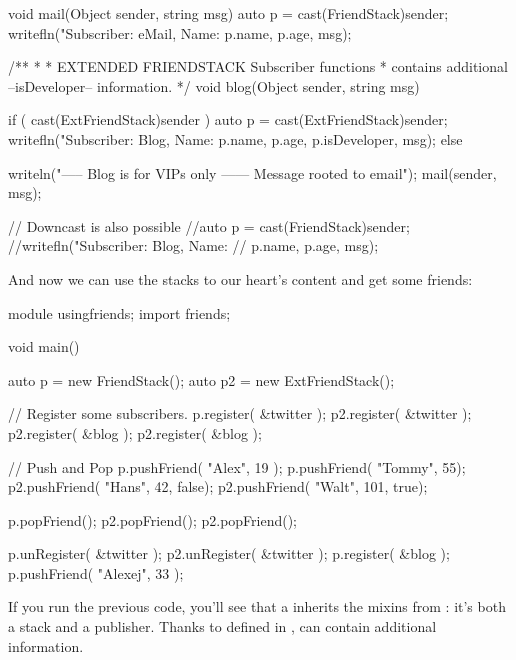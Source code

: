 \begin{dcode}
void mail(Object sender, string msg)
{
    auto p = cast(FriendStack)sender;
    writefln("Subscriber: eMail, Name: %
             p.name, p.age, msg);
}

/**
 *  
 *  EXTENDED FRIENDSTACK Subscriber functions
 *  contains additional --isDeveloper-- information.
 */
void blog(Object sender, string msg)
{
    if ( cast(ExtFriendStack)sender )
    {
        auto p = cast(ExtFriendStack)sender;
        writefln("Subscriber: Blog, Name: %
                 p.name, p.age, p.isDeveloper, msg);
    }
    else
    {
        writeln("----- Blog is for VIPs only ------ Message rooted to email");
        mail(sender, msg);
        
        // Downcast is also possible
        //auto p = cast(FriendStack)sender;
        //writefln("Subscriber: Blog, Name: %
        //         p.name, p.age, msg);
    }
}
\end{dcode}

And now we can use the stacks to our heart's content and get some friends:

\begin{dcode}
module usingfriends;
import friends;

void main()
{
    auto p = new FriendStack();
    auto p2 = new ExtFriendStack();
    
    // Register  some subscribers.
    p.register(  &twitter );    
    p2.register( &twitter );
    p2.register( &blog );
    p2.register( &blog );
    
    // Push and Pop 
    p.pushFriend( "Alex", 19 );         
    p.pushFriend( "Tommy", 55); 
    p2.pushFriend( "Hans", 42, false);  
    p2.pushFriend( "Walt", 101, true);  
    
    p.popFriend();
    p2.popFriend();
    p2.popFriend();
    
    p.unRegister( &twitter );
    p2.unRegister( &twitter );  
    p.register( &blog );
    p.pushFriend( "Alexej", 33 );       
}
\end{dcode}

If you run the previous code, you'll see that a  inherits the mixins from : it's both a stack and a publisher. Thanks to \DD{(}\DD{)} defined in ,  can contain additional information.

\section{} \label{opdispatch}

